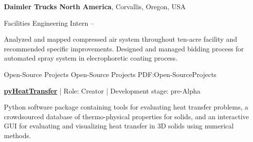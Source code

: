 \documentclass[letterpaper,MMMyyyy,nonstopmode]{simpleresumecv}
\begin{document}
\begin{Body}
\Entry
\textbf{Daimler Trucks North America},
Corvallis, Oregon, USA

\BulletItem
Facilities Engineering Intern
\hfill
{} --

\begin{Detail}
\SubBulletItem
Analyzed and mapped compressed air system throughout ten-acre facility and recommended specific improvements.
\SubBulletItem
Designed and managed bidding process for automated spray system in elecrophoretic coating process.
\end{Detail}


\Section
{Open-Source Projects}
{Open-Source Projects}
{PDF:Open-SourceProjects}

\Entry
\href{https://github.com/OSUmageed/pyHeatTransfer}{\textbf{pyHeatTransfer}} | Role: Creator | Development stage: pre-Alpha

Python software package containing tools for evaluating heat transfer problems, a crowdsourced database of thermo-physical properties for solids, and an interactive GUI for evaluating and visualizing heat transfer in 3D solids using numerical methods.

\end{Body}
\end{document}
